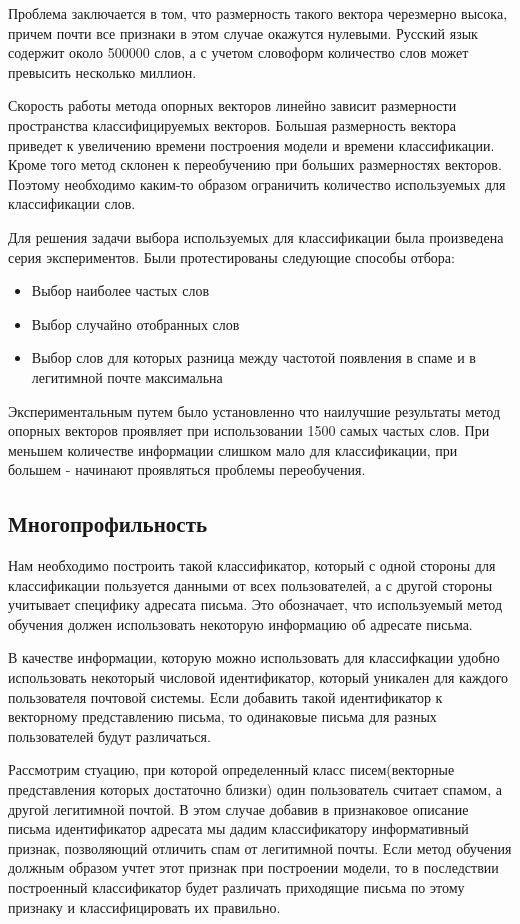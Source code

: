 Проблема заключается в том, что размерность такого вектора черезмерно высока, причем
почти все признаки в этом случае окажутся нулевыми. Русский язык содержит около 500000\cite{TUTIN} слов, а с
учетом словоформ количество слов может превысить несколько миллион.

Скорость работы метода опорных векторов линейно зависит размерности пространства классифицируемых векторов.
Большая размерность вектора приведет к увеличению времени построения модели и времени классификации.
Кроме того метод склонен к переобучению при больших размерностях векторов. Поэтому необходимо каким-то образом ограничить количество используемых для классификации слов.

Для решения задачи выбора используемых для классификации была произведена серия экспериментов.
Были протестированы следующие способы отбора:
\begin{itemize}
\item Выбор наиболее частых слов
\item Выбор случайно отобранных слов
\item Выбор слов для которых разница между частотой появления в спаме и в легитимной почте максимальна
\end{itemize}

Экспериментальным путем было установленно что наилучшие результаты метод опорных векторов проявляет при использовании 1500 самых частых слов. При меньшем количестве информации слишком мало для классификации, при большем - начинают проявляться проблемы переобучения.

\subsection{Многопрофильность}
\label{MULTIPROFILE}
Нам необходимо построить такой классификатор, который с одной стороны для классификации пользуется данными от  всех пользователей, а с другой стороны учитывает специфику адресата письма.  Это обозначает, что используемый метод обучения должен использовать некоторую информацию об адресате письма. 

В качестве информации, которую можно использовать для классифкации удобно использовать некоторый числовой идентификатор, который уникален для каждого пользователя почтовой системы. Если добавить такой идентификатор к векторному представлению письма, то одинаковые письма для разных пользователей будут различаться. 

Рассмотрим стуацию, при которой определенный класс писем(векторные представления которых достаточно близки) один пользователь считает спамом, а другой легитимной почтой.  В этом случае добавив в признаковое описание письма идентификатор адресата мы дадим классификатору информативный признак, позволяющий отличить спам от легитимной почты. Если метод обучения должным образом учтет этот признак при построении модели, то в последствии построенный классификатор будет различать приходящие письма по этому признаку и классифицировать их правильно. 

